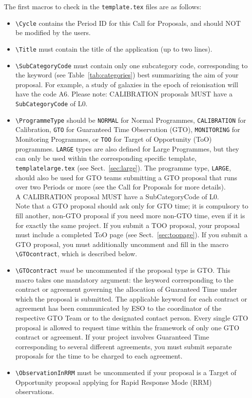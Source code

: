 \documentclass{article}
\begin{document}
The first macros to check in the {\tt template.tex} files are as follows:
\begin{itemize}
\item \verb|\Cycle| contains the Period ID for this Call for
  Proposals, and should NOT be modified by the users.
\item \verb|\Title| must contain the title of the application (up to
  two lines).
\item \verb|\SubCategoryCode| must contain only one subcategory code,
  corresponding to the keyword (see Table~\ref{tab:categories}) best
  summarizing the aim of your proposal. 
  For example, a study of
  galaxies in the epoch of reionisation will have the code A6. 
  Please note: CALIBRATION proposals MUST have a \verb|SubCategoryCode| of L0.
\item \verb|\ProgrammeType| should be {\tt NORMAL} for Normal Programmes, 
  {\tt CALIBRATION} for Calibration, {\tt GTO} for Guaranteed Time Observation 
  (GTO), {\tt MONITORING} for Monitoring Programmes, or {\tt TOO} for Target of 
  Opportunity (ToO) programmes.  
  {\tt LARGE} types are also defined for Large Programmes, but they can only be 
  used within the corresponding specific template, {\tt templatelarge.tex} 
  (see Sect.~\ref{sec:large}). The programme type, {\tt LARGE}, should also be used 
  for GTO teams submitting a GTO proposal that runs over two Periods or more (see the Call   
  for Proposals for more details).\\
  A CALIBRATION proposal MUST have a SubCategoryCode of L0.\\
  Note that a GTO proposal should ask only for GTO time; it is
  compulsory to fill another, non-GTO proposal if you need more non-GTO
  time, even if it is for exactly the same project. If you submit a
  TOO proposal, your proposal must include a completed ToO page
  (see Sect.~\ref{sec:toopage}). If you submit a GTO proposal, you
  must additionally uncomment and fill in the macro
  \verb|\GTOcontract|, which is described below.
\item \verb|\GTOcontract| {\em must\/} be uncommented if the proposal
  type is GTO. This macro takes one mandatory argument: 
  the keyword corresponding to the contract or agreement
  governing the allocation of Guaranteed Time under which the
  proposal is submitted. The applicable keyword for each contract or
  agreement has been communicated by ESO to the coordinator of the
  respective GTO Team or to the designated contact person. Every
  single GTO proposal is allowed to request time within the framework
  of only one GTO contract or agreement. If your project involves
  Guaranteed Time corresponding to several different agreements, you
  must submit separate proposals for the time to be charged to each
  agreement. 
\item \verb|\ObservationInRRM| must be uncommented if your proposal is
  a Target of Opportunity proposal applying for Rapid Response Mode
  (RRM) observations.
\end{itemize}
\end{document}

